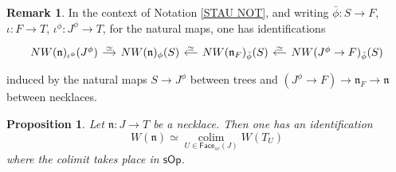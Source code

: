 \documentclass[a4paper,10pt
,draft
]{article}%
\numberwithin{equation}{section}
\numberwithin{figure}{section}
\newtheorem{proposition}[equation]{Proposition}%
\theoremstyle{definition} %
\newtheorem{remark}[equation]{Remark}%
\DeclareMathOperator{\colim}{colim}%
\newcommand{\1}{\ensuremath{\mathbbm 1}}%
\begin{document}
\begin{remark}\label{STAU REM}
	In the context of Notation \ref{STAU NOT},
	and writing 
	$\bar{\phi} \colon S \to F$,
	$\iota \colon F \to T$,
	$\iota^{\phi} \colon J^{\phi} \to T$,
	for the natural maps,
	one has identifications
	\begin{equation}
	\begin{tikzcd}[column sep = 12pt]
	NW(\mathfrak{n})_{\iota^{\phi}}(J^{\phi}) 
	\ar{r}{\simeq}
	&
	NW(\mathfrak{n})_{\phi}(S)
	&
	NW(\mathfrak{n}_F)_{\bar{\phi}}(S)
	\ar{l}[swap]{\simeq}
	&
	NW(J^{\phi} \to F)_{\bar{\phi}}(S)
	\ar{l}[swap]{\simeq}
	\end{tikzcd}
	\end{equation}
	induced by the natural maps
	$S \to J^{\phi}$ between trees and 
	$(J^{\phi} \to F) \to
	\mathfrak{n}_F \to \mathfrak{n}$
	between necklaces.
\end{remark}




\begin{proposition}\label{NECKCOL PROP}
	Let $\mathfrak{n} \colon J \to T$ be a necklace.
	Then one has an identification
	\begin{equation}\label{NECKCOL EQ}
	W(\mathfrak{n})
	\simeq 
	\underset{U \in \mathsf{Face}_{sc}(J)}{\colim}
	W(T_U)
	\end{equation}
	where the colimit takes place 
	in $\mathsf{sOp}$.
\end{proposition}
\end{document}
